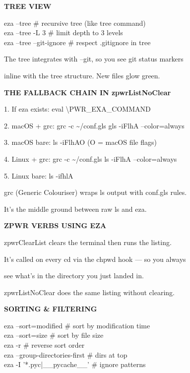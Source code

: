\documentclass[11pt,a4paper,twoside]{book}
\begin{document}
\vspace{12pt}
{\bfseries\color{neonyellow} TREE VIEW}\vspace{4pt}

\begin{codebox}
eza --tree          \# recursive tree (like tree command)\\
eza --tree -L 3     \# limit depth to 3 levels\\
eza --tree --git-ignore \# respect .gitignore in tree\\
\end{codebox}

The tree integrates with --git, so you see git status markers

inline with the tree structure. New files glow green.


\vspace{12pt}
{\bfseries\color{neonyellow} THE FALLBACK CHAIN IN zpwrListNoClear}\vspace{4pt}

1. If eza exists: eval \textbackslash{}PWR\_EXA\_COMMAND

2. macOS + grc: grc -c \textasciitilde{}/conf.gls gls -iFlhA --color=always

3. macOS bare: ls -iFlhAO (O = macOS file flags)

4. Linux + grc: grc -c \textasciitilde{}/conf.gls ls -iFlhA --color=always

5. Linux bare: ls -ifhlA

grc (Generic Colouriser) wraps ls output with conf.gls rules.

It's the middle ground between raw ls and eza.


\vspace{12pt}
{\bfseries\color{neonyellow} ZPWR VERBS USING EZA}\vspace{4pt}

zpwrClearList clears the terminal then runs the listing.

It's called on every cd via the chpwd hook — so you always

see what's in the directory you just landed in.

zpwrListNoClear does the same listing without clearing.


\vspace{12pt}
{\bfseries\color{neonyellow} SORTING \& FILTERING}\vspace{4pt}

\begin{codebox}
eza --sort=modified  \# sort by modification time\\
eza --sort=size      \# sort by file size\\
eza -r               \# reverse sort order\\
eza --group-directories-first \# dirs at top\\
eza -I '*.pyc|\_\_pycache\_\_'   \# ignore patterns\\
\end{codebox}
\end{document}
